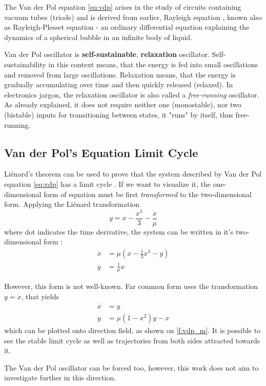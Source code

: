 \documentclass[journal]{IEEEtran}
\begin{document}
The Van der Pol equation \eqref{eq:vdp} arises in the study of circuits containing vacuum tubes (triode) and is derived from earlier, Rayleigh equation \cite{nahin2001science}, known also as Rayleigh-Plesset equation - an ordinary differential equation explaining the dynamics of a spherical bubble in an infinite body of liquid.

Van der Pol oscillator is \textbf{self-sustainable}, \textbf{relaxation} oscillator. Self-sustainability in this context means, that the energy is fed into small oscillations and removed from large oscillations. Relaxation means, that the energy is gradually accumulating over time and then quickly released (relaxed). In electronics jargon, the relaxation oscillator is also called a \textit{free-running} oscillator. As already explained, it does not require neither one (monostable), nor two (bistable) inputs for transitioning between states, it "runs" by itself, thus free-running.

\subsection{Van der Pol's Equation Limit Cycle}
Li\'{e}nard's theorem can be used to prove that the system described by  Van der Pol equation \eqref{eq:vdp} has a limit cycle \cite{sternberg2014dynamical}. If we want to visualize it, the one-dimensional form of equation must be first \textit{transformed} to the two-dimensional form. Applying the Li\'{e}nard transformation $$y=x-\frac{x^3}{3}-\frac{\dot x}{\mu}$$ where dot indicates the time derivative, the system can be written in it's two-dimensional form \cite{kaplan2012understanding}:
\begin{align*}
\dot x &= \mu \left(x-\frac13 x^3 -y\right) \\
\dot y &= \frac{1}{\mu} x
\end{align*}

However, this form is not well-known. Far common form uses the transformation $y=\dot x$, that yields
\begin{align*}
\dot x &= y \\
\dot y &= \mu\left(1-x^2\right)y-x
\end{align*}
which can be plotted onto direction field, as shown on \cref{f:vdp_m}. It is possible to see the stable limit cycle as well as trajectories from both sides attracted towards it.

The Van der Pol oscillator can be forced too, however, this work does not aim to investigate further in this direction.
\end{document}
